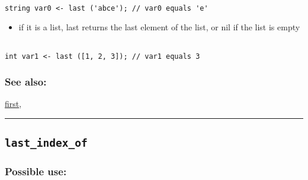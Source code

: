 \documentclass[]{book}
\providecommand{\tightlist}{%
  \setlength{\itemsep}{0pt}\setlength{\parskip}{0pt}}
\theoremstyle{definition}
\theoremstyle{definition}
\theoremstyle{definition}
\theoremstyle{remark}
\begin{document}
\begin{verbatim}
 
string var0 <- last ('abce'); // var0 equals 'e'
\end{verbatim}

\begin{itemize}
\tightlist
\item
  if it is a list, last returns the last element of the list, or nil if
  the list is empty
\end{itemize}

\begin{verbatim}
 
int var1 <- last ([1, 2, 3]); // var1 equals 3
\end{verbatim}

\subsubsection{See also:}\label{see-also-122}

\href{OperatorsDH\#first}{first},

\begin{center}\rule{0.5\linewidth}{\linethickness}\end{center}

\subsection{\texorpdfstring{\texttt{last\_index\_of}}{last\_index\_of}}\label{last_index_of}

\subsubsection{Possible use:}\label{possible-use-317}
\end{document}
